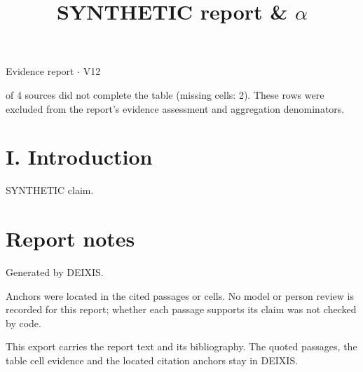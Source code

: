\documentclass[journal]{IEEEtran}
\begin{document}
\title{SYNTHETIC report \& \ensuremath{\alpha}}

\maketitle

\noindent Evidence report \ensuremath{\cdot} V12

 of 4 sources did not complete the table (missing cells: 2). These rows were excluded from the report's evidence assessment and aggregation denominators.

\section*{I. Introduction}

SYNTHETIC claim. \cite{Synth26}

\section*{Report notes}

Generated by DEIXIS.

Anchors were located in the cited passages or cells. No model or person review is recorded for this report; whether each passage supports its claim was not checked by code.

This export carries the report text and its bibliography. The quoted passages, the table cell evidence and the located citation anchors stay in DEIXIS.




\end{document}
